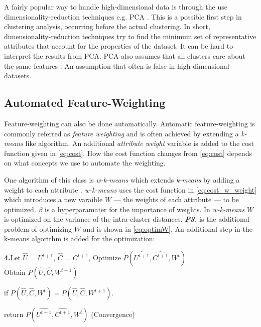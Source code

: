 \documentclass[../report.tex]{subfiles}
\begin{document}
A fairly popular way to handle high-dimensional data is through the use dimensionality-reduction techniques e.g. PCA \cite{Jolliffe2005,van2009}. This is a possible first step in clustering analysis, occurring before the actual clustering. In short, dimensionality-reduction techniques try to find the minimum set of representative attributes that account for the properties of the dataset. It can be hard to interpret the results from PCA. PCA also assumes that all clusters care about the same features \cite{Deng2010}. An assumption that often is false in high-dimensional datasets.

\subsection{Automated Feature-Weighting}
Feature-weighting can also be done automatically. Automatic feature-weighting is commonly referred as \textit{feature weighting} and is often achieved by extending a \textit{k-means} like algorithm. An additional \textit{attribute weight} variable is added to the cost function given in \ref{eq:cost}. How the cost function changes from \ref{eq:cost} depends on what concepts we use to automate the weighting.

One algorithm of this class is \textit{w-k-means} which extends \textit{k-means} by adding a weight to each attribute \cite{huang2005automated}.
\textit{w-k-means} uses the cost function in \ref{eq:cost_w_weight} which introduces a new varaible $W$ --- the weights of each attribute --- to be optimized. $\beta$ is a hyperparamater for the importance of weights. In \textit{w-k-means} $W$ is optimized on the variance of the intra-cluster distances. \textit\textbf{P3.} is the additional problem of optimizing $W$ and is shown in \ref{eq:optimW}. An additional step in the k-means algorithm is added for the optimization:

\textbf{4.}\quad Let $\hat{U}$ = $U^{t+1}$, $\hat{C}$ = $C^{t+1}$, Optimize $P(\hat{U^{t+1}}, \hat{ C^{t + 1} }, W^{t})$ \\
\quad  Obtain $P(\hat{U}, \hat{ C }, W^{t + 1})$
\begin{description}
  \item if $P(\hat{U}, \hat{ C }, W^{t}) = P(\hat{U}, \hat{ C }, W^{t + 1})$.

  \item \quad return $P(\hat{U^{t+1}}, \hat{ C^{t + 1} }, W^{t})$ (Convergence)
\end{description}
\end{document}
